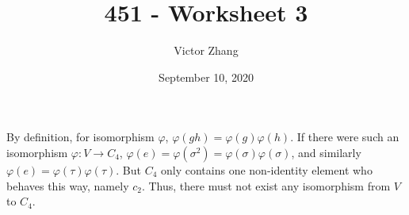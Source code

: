 \documentclass{article}
\title{451 - Worksheet 3}
\author{Victor Zhang}
\date{September 10, 2020}
\begin{document}
\maketitle

\section{}
By definition, for isomorphism $\varphi$, $\varphi(gh) = \varphi(g)\varphi(h)$.
If there were such an isomorphism $\varphi: V \rightarrow C_4$, $\varphi(e) = \varphi(\sigma^2) = \varphi(\sigma)\varphi(\sigma)$, and similarly $\varphi(e) = \varphi(\tau)\varphi(\tau)$. But $C_4$ only contains one non-identity element who behaves this way, namely $c_2$. Thus, there must not exist any isomorphism from $V$ to $C_4$.
\end{document}
